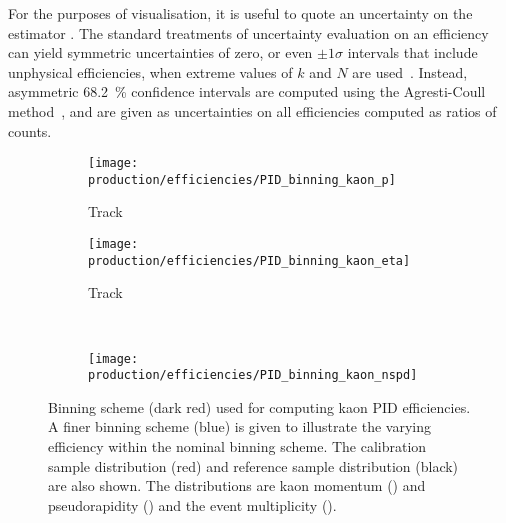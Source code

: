 For the purposes of visualisation, it is useful to quote an uncertainty on the
estimator \effest.
The standard treatments of uncertainty evaluation on an efficiency can yield
symmetric uncertainties of zero, or even $\pm1\sigma$ intervals that include
unphysical efficiencies, when extreme values of $k$ and $N$ are
used~\cite{Paterno:2004cb}.
Instead, asymmetric \SI{68.2}{\percent} confidence intervals are computed using
the Agresti-Coull method~\cite{Agresti:2685469}, and are given as uncertainties
on all efficiencies computed as ratios of counts.

\begin{figure}
  \begin{subfigure}[b]{0.5\textwidth}
    \centering
    \texttt{[image: production/efficiencies/PID\_binning\_kaon\_p]}
    \caption{Track \ptot}
    \label{fig:prod:effs:pid:binning:kaon:p}
  \end{subfigure}
  \begin{subfigure}[b]{0.5\textwidth}
    \centering
    \texttt{[image: production/efficiencies/PID\_binning\_kaon\_eta]}
    \caption{Track \Eta}
    \label{fig:prod:effs:pid:binning:kaon:eta}
  \end{subfigure}
  \\[0.5cm]
  \begin{subfigure}[b]{0.5\textwidth}
    \centering
    \texttt{[image: production/efficiencies/PID\_binning\_kaon\_nspd]}
    \caption{\nspd}
    \label{fig:prod:effs:pid:binning:kaon:nspd}
  \end{subfigure}
  \caption{%
    Binning scheme (dark red) used for computing kaon \ac{PID} efficiencies.
    A finer binning scheme (blue) is given to illustrate the varying efficiency
    within the nominal binning scheme.
    The calibration sample distribution (red) and reference sample distribution
    (black) are also shown.
    The distributions are kaon momentum
    () and pseudorapidity
    () and the event multiplicity
    ().
  }
  \label{fig:prod:pid:binning:kaon}
\end{figure}

